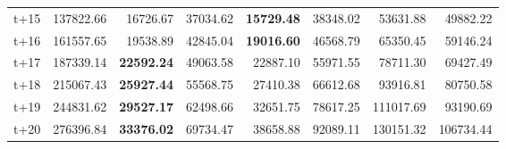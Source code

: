 \begin{table}[H]
\begin{tabular}{lrrrrrrr}
t+15  & 137822.66  & 16726.67  & 37034.62  & \textbf{15729.48}  & 38348.02  & 53631.88  & 49882.22  \\
t+16  & 161557.65  & 19538.89  & 42845.04  & \textbf{19016.60}  & 46568.79  & 65350.45  & 59146.24  \\
t+17  & 187339.14  & \textbf{22592.24}  & 49063.58  & 22887.10  & 55971.55  & 78711.30  & 69427.49  \\
t+18  & 215067.43  & \textbf{25927.44}  & 55568.75  & 27410.38  & 66612.68  & 93916.81  & 80750.58  \\
t+19  & 244831.62  & \textbf{29527.17}  & 62498.66  & 32651.75  & 78617.25  & 111017.69  & 93190.69  \\
t+20  & 276396.84  & \textbf{33376.02}  & 69734.47  & 38658.88  & 92089.11  & 130151.32  & 106734.44  \\

\bottomrule
\end{tabular}
\end{table}
